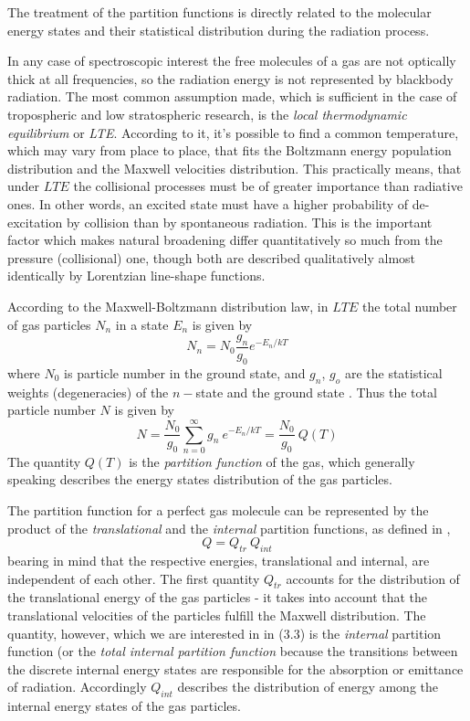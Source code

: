 The treatment of the partition functions is directly related to the molecular
energy states and their statistical distribution during the
radiation process. 

In any case of spectroscopic interest the free molecules of a gas are
not optically thick at all frequencies, so the radiation energy is not
represented by blackbody radiation. The most common assumption made,
which is sufficient in the case of tropospheric and low stratospheric
research, is the {\textit{local thermodynamic equilibrium}\nocorr} or
{\textit{LTE}\nocorr}. According to it, it's possible to find a common temperature,
which may vary from place to place, that fits the Boltzmann energy
population distribution and the Maxwell velocities distribution.
This practically means, that under $LTE$ the collisional processes
must be of greater importance than radiative ones. In other words,
an excited state must have a higher probability of de-excitation by
collision than by spontaneous radiation. This is the important
factor which makes natural broadening differ quantitatively so much
from the pressure (collisional) one, though both are described
qualitatively almost identically by Lorentzian line-shape
functions.

According to the Maxwell-Boltzmann distribution law, in $LTE$ the total number
of gas particles $N_n$  in a state $E_n$ is given by 
\begin{equation}\label{maxwell_distribution}
 N_n=N_0\frac{g_n}{g_0}e^{-E_n/kT}
\end{equation}
where $N_0$ is particle number in the ground state, and $g_n$, $g_o$
are the statistical weights (degeneracies) of the $n-$state and the
ground state \citep{gordyandcook:70}. Thus the total particle number $N$ is given by
\begin{equation}\label{total_part_number}
 N=\frac{N_0}{g_0}\sum_{n=0}^\infty g_n~e^{-E_n/kT}=\frac{N_0}{g_0}~Q(T)
\end{equation}
The quantity $Q(T)$ is the {\it{partition function}\nocorr} of the
gas, which generally speaking describes the energy states distribution
of the gas particles. 

The partition function for a perfect gas molecule can be represented
by the product of the {\it{translational}\nocorr} and the
{\it{internal}\nocorr} partition functions, as defined in \citet{herzberg:45},
\begin{equation}\label{partition_f_general}
 Q  =  Q_{tr}~Q_{int}
\end{equation}
bearing in mind that the respective energies, translational and
internal, are independent of each other. The first quantity $Q_{tr}$ accounts
for the distribution of the translational energy of the gas particles
- it takes into account that the translational velocities of the
particles fulfill the Maxwell distribution. The quantity, however,
which we are interested in in (3.3) is the {\it{internal}\nocorr}
partition function (or the {\it{total internal partition  function}\nocorr}
 because the transitions between the discrete
internal energy states are responsible for the absorption or emittance
of radiation. Accordingly $Q_{int}$ describes the
distribution of energy among the internal energy states of the gas
particles.

